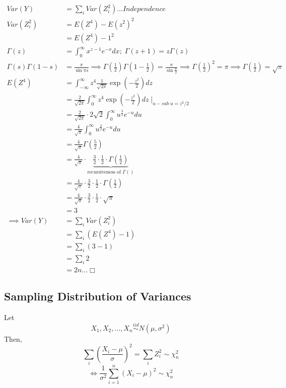 \documentclass[
]{article}
\begin{document}
\[\begin{aligned}
Var(Y) &= \sum_i Var(Z_i^2) \dots Independence \\
Var(Z_i^2) &= E(Z^4) - E(z^2)^2 \\
&= E(Z^4) - 1^2 \\
\Gamma(z) &= \int^\infty_0x^{z-1}e^{-x}dx; \; \Gamma(z+1) = z\Gamma(z) \\
\Gamma(s)\Gamma(1-s) &= \frac{\pi}{\sin \pi s} 
\implies \Gamma(\frac{1}{2})\Gamma(1-\frac{1}{2}) = \frac{\pi}{\sin\frac{\pi}{2}} 
\implies \Gamma(\frac{1}{2})^2 = \pi 
\implies \Gamma(\frac{1}{2}) = \sqrt{\pi} \\
E(Z^4) &= \int _{-\infty}^{\infty}z^4 \frac{1}{\sqrt{2\pi}}\exp(-\frac{z^2}{2})dz \\
&= \frac{2}{\sqrt{2\pi}}\int _{0}^{\infty}z^4 \exp(-\frac{z^2}{2})dz \mid _{u-sub\; u = z^2/2} \\
&= \frac{2}{\sqrt{2\pi}}\cdot 2\sqrt{2}\int^\infty_0 u^{\frac{3}{2}}e^{-u}du \\
&= \frac{4}{\sqrt{\pi}}\int^\infty_0 u^{\frac{3}{2}}e^{-u}du \\
&= \frac{4}{\sqrt{\pi}}\Gamma(\frac{5}{2}) \\
&= \frac{4}{\sqrt{\pi}}\cdot\underbrace{\frac{3}{2}\cdot\frac{1}{2}\cdot\Gamma(\frac{1}{2})}_\text{recursiveness of \(\Gamma()\)} \\
&= \frac{4}{\sqrt{\pi}}\cdot\frac{3}{2}\cdot\frac{1}{2}\cdot\Gamma(\frac{1}{2})\\
&= \frac{4}{\sqrt{\pi}}\cdot\frac{3}{2}\cdot\frac{1}{2}\cdot\sqrt{\pi}\\
&= 3\\
\implies Var(Y) &= \sum_i Var(Z_i^2) \\
&= \sum_i \left( E(Z^4) - 1 \right) \\
&= \sum_i (3 - 1) \\
&= \sum_i 2 \\
&= 2n\dots \Box
\end{aligned}\]

\hypertarget{sampling-distribution-of-variances}{%
\subsection{Sampling Distribution of
Variances}\label{sampling-distribution-of-variances}}

Let \[X_1, X_2, \dots, X_n \stackrel{iid}{\sim} N(\mu, \sigma^2)\] Then,
\[\sum_i \left(\frac{X_i - \mu}{\sigma}\right)^2 = \sum_i Z_i^2 \sim \chi^2_n\]
\boldmath \[\iff \frac{1}{\sigma^2}\sum_{i=1}^n (X_i - \mu)^2 \sim \chi^2_n\]
\unboldmath
\end{document}
